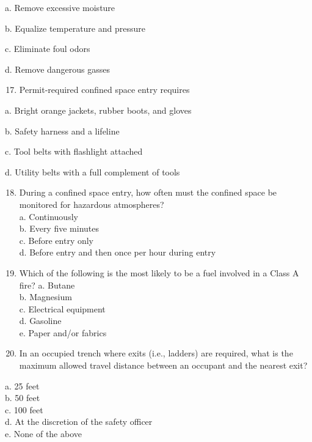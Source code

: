 \documentclass[10pt]{article}
\begin{document}
\begin{enumerate}
\begin{enumerate}
\begin{enumerate}
\end{enumerate}

a. Remove excessive moisture

b. Equalize temperature and pressure

c. Eliminate foul odors

d. Remove dangerous gasses

\begin{enumerate}
  \setcounter{enumi}{16}
  \item Permit-required confined space entry requires
\end{enumerate}

a. Bright orange jackets, rubber boots, and gloves

b. Safety harness and a lifeline

c. Tool belts with flashlight attached

d. Utility belts with a full complement of tools

\begin{enumerate}
  \setcounter{enumi}{17}
  \item During a confined space entry, how often must the confined space be monitored for hazardous atmospheres?\\
a. Continuously\\
b. Every five minutes\\
c. Before entry only\\
d. Before entry and then once per hour during entry\\

  \item Which of the following is the most likely to be a fuel involved in a Class A fire?
a. Butane\\
b. Magnesium\\
c. Electrical equipment\\
d. Gasoline\\
e. Paper and/or fabrics

  \item In an occupied trench where exits (i.e., ladders) are required, what is the maximum allowed travel distance between an occupant and the nearest exit?\\

\end{enumerate}

a. 25 feet\\
b. 50 feet\\
c. 100 feet\\
d. At the discretion of the safety officer\\
e. None of the above


\end{enumerate}
\end{enumerate}
\end{document}
